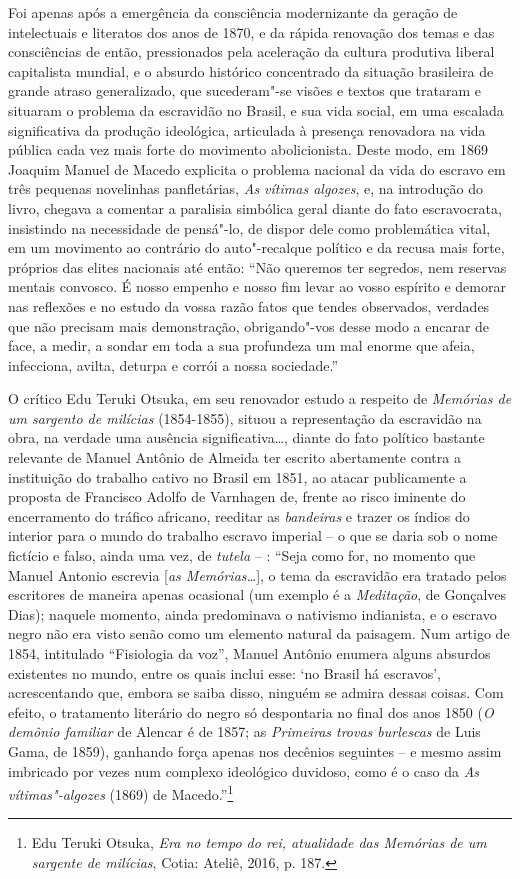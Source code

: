 Foi apenas após a emergência da consciência modernizante da geração de
intelectuais e literatos dos anos de 1870, e da rápida renovação dos
temas e das consciências de então, pressionados pela aceleração da
cultura produtiva liberal capitalista mundial, e o absurdo histórico
concentrado da situação brasileira de grande atraso generalizado, que
sucederam"-se visões e textos que trataram e situaram o problema da
escravidão no Brasil, e sua vida social, em uma escalada significativa
da produção ideológica, articulada à presença renovadora na vida pública
cada vez mais forte do movimento abolicionista. Deste modo, em 1869
Joaquim Manuel de Macedo explicita o problema nacional da vida do
escravo em três pequenas novelinhas panfletárias, \emph{As vítimas
algozes}, e, na introdução do livro, chegava a comentar a paralisia
simbólica geral diante do fato escravocrata, insistindo na necessidade
de pensá"-lo, de dispor dele como problemática vital, em um movimento ao
contrário do auto"-recalque político e da recusa mais forte, próprios das
elites nacionais até então: ``Não queremos ter segredos, nem reservas
mentais convosco. É nosso empenho e nosso fim levar ao vosso espírito e
demorar nas reflexões e no estudo da vossa razão fatos que tendes
observados, verdades que não precisam mais demonstração, obrigando"-vos
desse modo a encarar de face, a medir, a sondar em toda a sua profundeza
um mal enorme que afeia, infecciona, avilta, deturpa e corrói a nossa
sociedade.''

O crítico Edu Teruki Otsuka, em seu renovador estudo a respeito de
\emph{Memórias de um sargento de milícias} (1854-1855), situou a
representação da escravidão na obra, na verdade uma ausência
significativa\ldots{}, diante do fato político bastante relevante de Manuel
Antônio de Almeida ter escrito abertamente contra a instituição do
trabalho cativo no Brasil em 1851, ao atacar publicamente a proposta de
Francisco Adolfo de Varnhagen de, frente ao risco iminente do
encerramento do tráfico africano, reeditar as \emph{bandeiras} e trazer
os índios do interior para o mundo do trabalho escravo imperial -- o que
se daria sob o nome fictício e falso, ainda uma vez, de \emph{tutela} --
: ``Seja como for, no momento que Manuel Antonio escrevia {[}\emph{as
Memórias\ldots{}}{]}, o tema da escravidão era tratado pelos escritores de
maneira apenas ocasional (um exemplo é a \emph{Meditação}, de Gonçalves
Dias); naquele momento, ainda predominava o nativismo indianista, e o
escravo negro não era visto senão como um elemento natural da paisagem.
Num artigo de 1854, intitulado ``Fisiologia da voz'', Manuel Antônio
enumera alguns absurdos existentes no mundo, entre os quais inclui esse:
`no Brasil há escravos', acrescentando que, embora se saiba disso,
ninguém se admira dessas coisas. Com efeito, o tratamento literário do
negro só despontaria no final dos anos 1850 (\emph{O demônio familiar}
de Alencar é de 1857; as \emph{Primeiras trovas burlescas} de Luis Gama,
de 1859), ganhando força apenas nos decênios seguintes -- e mesmo assim
imbricado por vezes num complexo ideológico duvidoso, como é o caso da
\emph{As vítimas"-algozes} (1869) de Macedo.''\footnote{Edu Teruki
  Otsuka, \emph{Era no tempo do rei, atualidade das Memórias de um
  sargente de milícias}, Cotia: Ateliê, 2016, p. 187.}

